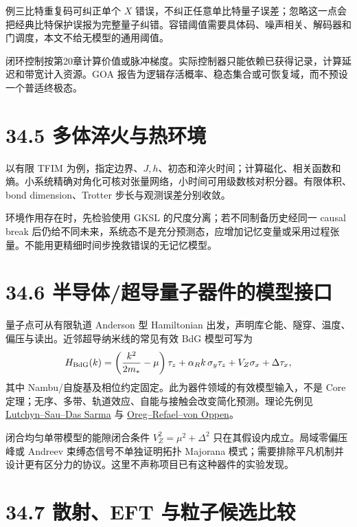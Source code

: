 \documentclass[
  11pt,
  oneside]{book}
\begin{document}
例三比特重复码可纠正单个 \(X\)
错误，不纠正任意单比特量子误差；忽略这一点会把经典比特保护误报为完整量子纠错。容错阈值需要具体码、噪声相关、解码器和门调度，本文不给无模型的通用阈值。

闭环控制按第20章计算价值或脉冲梯度。实际控制器只能依赖已获得记录，计算延迟和带宽计入资源。GOA
报告为逻辑存活概率、稳态集合或可恢复域，而不预设一个普适终极态。

\hypertarget{ux591aux4f53ux6decux706bux4e0eux70edux73afux5883}{%
\section{34.5
多体淬火与热环境}\label{ux591aux4f53ux6decux706bux4e0eux70edux73afux5883}}

以有限 TFIM
为例，指定边界、\(J,h\)、初态和淬火时间；计算磁化、相关函数和熵。小系统精确对角化可核对张量网络，小时间可用级数核对积分器。有限体积、bond
dimension、Trotter 步长与观测误差分别收敛。

环境作用存在时，先检验使用 GKSL 的尺度分离；若不同制备历史经同一 causal
break
后仍给不同未来，系统态不是充分预测态，应增加记忆变量或采用过程张量。不能用更精细时间步挽救错误的无记忆模型。

\hypertarget{ux534aux5bfcux4f53ux8d85ux5bfcux91cfux5b50ux5668ux4ef6ux7684ux6a21ux578bux63a5ux53e3}{%
\section{34.6
半导体/超导量子器件的模型接口}\label{ux534aux5bfcux4f53ux8d85ux5bfcux91cfux5b50ux5668ux4ef6ux7684ux6a21ux578bux63a5ux53e3}}

量子点可从有限轨道 Anderson 型 Hamiltonian
出发，声明库仑能、隧穿、温度、偏压与读出。近邻超导纳米线的常见有效 BdG
模型可写为 \[
H_{\rm BdG}(k)=
\left(\frac{k^2}{2m_*}-\mu\right)\tau_z
+\alpha_R k\,\sigma_y\tau_z+V_Z\sigma_x+\Delta\tau_x,
\] 其中 Nambu/自旋基及相位约定固定。此为器件领域的有效模型输入，不是
Core 定理；无序、多带、轨道效应、自能与接触会改变简化预测。理论先例见
\href{https://arxiv.org/abs/1002.4033}{Lutchyn--Sau--Das Sarma} 与
\href{https://arxiv.org/abs/1003.1145}{Oreg--Refael--von Oppen}。

闭合均匀单带模型的能隙闭合条件 \(V_Z^2=\mu^2+\Delta^2\)
只在其假设内成立。局域零偏压峰或 Andreev 束缚态信号不单独证明拓扑
Majorana
模式；需要排除平凡机制并设计更有区分力的协议。这里不声称项目已有这种器件的实验发现。

\hypertarget{ux6563ux5c04eft-ux4e0eux7c92ux5b50ux5019ux9009ux6bd4ux8f83}{%
\section{34.7 散射、EFT
与粒子候选比较}\label{ux6563ux5c04eft-ux4e0eux7c92ux5b50ux5019ux9009ux6bd4ux8f83}}
\end{document}
